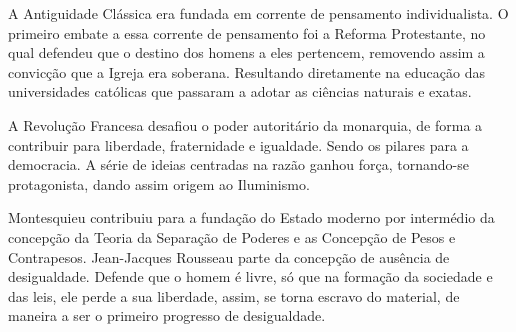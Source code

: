 A Antiguidade Clássica era fundada em corrente de pensamento individualista.
O primeiro embate a essa corrente de pensamento foi a Reforma Protestante, no qual defendeu que o destino dos homens a eles pertencem, removendo assim a convicção que a Igreja era soberana.
Resultando diretamente na educação das universidades católicas que passaram a adotar as ciências naturais e exatas.

A Revolução Francesa desafiou o poder autoritário da monarquia, de forma a contribuir para liberdade, fraternidade e igualdade.
Sendo os pilares para a democracia. 
A série de ideias centradas na razão ganhou força, tornando-se protagonista, dando assim origem ao Iluminismo. 

Montesquieu contribuiu para a fundação do Estado moderno por intermédio da concepção da Teoria da Separação de Poderes e as Concepção de Pesos e Contrapesos.
Jean-Jacques Rousseau parte da concepção de ausência de desigualdade.
Defende que o homem é livre, só que na formação da sociedade e das leis, ele perde a sua liberdade, assim, se torna escravo do material, de maneira a ser o primeiro progresso de desigualdade.
